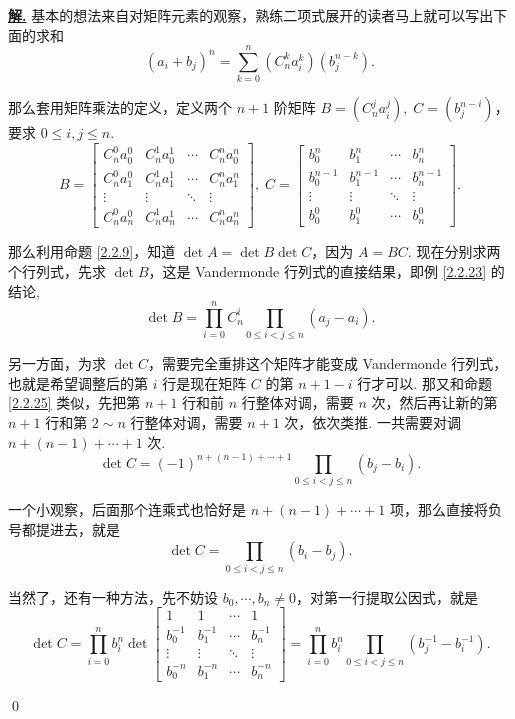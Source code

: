 \documentclass[10pt,openany]{article}
\theoremstyle{thmstyle} %
\theoremstyle{defstyle} %
\theoremstyle{prostyle} %
\theoremstyle{exastyle}
\theoremstyle{remstyle}
\newenvironment{solution}{\par\underline{\textbf{解.}} \;\fangsong}{\qed\par}
\begin{document}
\begin{solution}
	基本的想法来自对矩阵元素的观察，熟练二项式展开的读者马上就可以写出下面的求和
	\[ (a_i+b_j)^n=\sum_{k=0}^{n} (C_n^k a_i^k) (b_j^{n-k}). \]
	
	那么套用矩阵乘法的定义，定义两个 \( n+1 \) 阶矩阵 \( B=(C_n^j a_i^j), \; C=(b_j^{n-i}) \)，要求 \( 0 \leq i,j \leq n \). 
	\[ B= \begin{bmatrix}
		C_n^0 a_0^0 & C_n^1 a_0^1 & \cdots & C_n^n a_0^n \\
		C_n^0 a_1^0 & C_n^1 a_1^1 & \cdots & C_n^n a_1^n \\
		\vdots & \vdots & \ddots & \vdots \\
		C_n^0 a_n^0 & C_n^1 a_n^1 & \cdots & C_n^n a_n^n 
	\end{bmatrix}, \; C= \begin{bmatrix}
	b_0^{n} & b_1^{n} & \cdots & b_n^{n} \\
	b_0^{n-1} & b_1^{n-1} & \cdots & b_n^{n-1} \\
	\vdots & \vdots & \ddots & \vdots \\
	b_0^{0} & b_1^{0} & \cdots & b_n^{0}  
	\end{bmatrix}. \]
	
	那么利用命题 \ref{2.2.9}，知道 \( \det A=\det B\det C \)，因为 \( A=BC \). 现在分别求两个行列式，先求 \( \det B \)，这是 Vandermonde 行列式的直接结果，即例 \ref{2.2.23} 的结论, 
	\[  \det B= \prod_{i=0}^{n} C_n^i \prod_{0 \leq i<j \leq n}^{} (a_j-a_i). \]
	
	另一方面，为求 \( \det C \)，需要完全重排这个矩阵才能变成 Vandermonde 行列式，也就是希望调整后的第 \( i \) 行是现在矩阵 \( C \) 的第 \( n+1-i \) 行才可以. 那又和命题 \ref{2.2.25} 类似，先把第 \( n+1 \) 行和前 \( n \) 行整体对调，需要 \( n \) 次，然后再让新的第 \( n+1 \) 行和第 \( 2 \sim n \) 行整体对调，需要 \( n+1 \) 次，依次类推. 一共需要对调 \( n+(n-1)+\cdots+1 \) 次.
	\[ \det C= (-1)^{n+(n-1)+\cdots+1} \prod_{0 \leq i<j \leq n}^{} (b_j-b_i). \]
	
	一个小观察，后面那个连乘式也恰好是 \( n+(n-1)+\cdots+1 \) 项，那么直接将负号都提进去，就是
	\[ \det C=\prod_{0 \leq i<j \leq n}^{} (b_i-b_j). \]
	
	当然了，还有一种方法，先不妨设 \( b_0,\cdots,b_n \neq 0 \)，对第一行提取公因式，就是
	\[ \det C= \prod_{i=0}^{n} b_i^n \det\begin{bmatrix}
		1 & 1 & \cdots & 1 \\
		b_0^{-1} & b_1^{-1} & \cdots & b_n^{-1} \\
		\vdots & \vdots & \ddots & \vdots \\
		b_0^{-n} & b_1^{-n} & \cdots & b_n^{-n}  
	\end{bmatrix}= \prod_{i=0}^{n} b_i^n \prod_{0 \leq i<j \leq n}^{} (b_j^{-1}-b_i^{-1}). \]
	

\end{solution}
\end{document}
